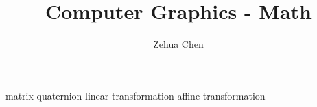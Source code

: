 \documentclass[letterpaper, 11pt]{report}
\title{Computer Graphics - Math}
\author{Zehua Chen}
\begin{document}
  \maketitle
  \tableofcontents

  {matrix}
  {quaternion}
  {linear-transformation}
  {affine-transformation}
\end{document}
